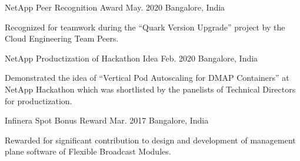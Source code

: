 




\begin{cventries}

  \honorentry
    {NetApp} %
    {Peer Recognition Award} %
    {May. 2020} %
    {Bangalore, India}
    {
	\begin{cvitems2}
	  \item {Recognized for teamwork during the ``Quark Version Upgrade'' project by the Cloud Engineering Team Peers.} %
	\end{cvitems2}
    }

  \honorentry
    {NetApp} %
    {Productization of Hackathon Idea} %
    {Feb. 2020} %
    {Bangalore, India}
    {
	\begin{cvitems2}
	  \item {Demonstrated the idea of ``Vertical Pod Autoscaling for DMAP Containers'' at NetApp Hackathon which was shortlisted by the panelists of Technical Directors for productization.} %
	\end{cvitems2}
    }

  \honorentry
    {Infinera} %
    {Spot Bonus Reward} %
    {Mar. 2017} %
    {Bangalore, India}
    {
	\begin{cvitems2}
	  \item {Rewarded for significant contribution to design and development of management plane software of Flexible Broadcast Modules.} %
	\end{cvitems2}
    }


\end{cventries}
